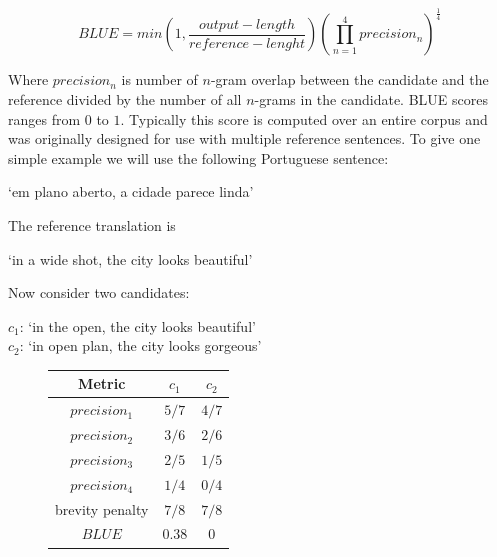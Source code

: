\begin{equation}
BLUE = min \left(1, \frac{output-length}{reference-lenght} \right) \left(\prod_{n=1}^{4} precision_{n} \right)^{\frac{1}{4}}
\end{equation}

Where $precision_{n}$ is number of $n$-gram overlap between the candidate and the reference divided by the number of all $n$-grams in the candidate. BLUE scores ranges from $0$ to $1$. Typically this score is computed over an entire corpus and was originally designed for use with multiple reference sentences. To give one simple example we will use the following Portuguese sentence:

\begin{center}
`em plano aberto, a cidade parece linda'
\end{center}

The reference translation is

\begin{center}
`in a wide shot, the city looks beautiful'
\end{center}

Now consider two candidates:

\begin{center}
$c_1$: `in the open, the city looks beautiful'\\
$c_2$: `in open plan, the city looks gorgeous'\\
\end{center}

\begin{figure}
\label{bluetable}
\begin{center}
\begin{tabular}{|c|c|c|}
\hline
\cellcolor{blue!10} Metric& \cellcolor{blue!10} $c_1$ & \cellcolor{blue!10} $c_2$ \\ \hline
\cellcolor{blue!10} $precision_1$& $5/7$ & $4/7$ \\ \hline
\cellcolor{blue!10} $precision_2$& $3/6$ & $2/6$  \\ \hline
\cellcolor{blue!10} $precision_3$& $2/5$ & $1/5$  \\ \hline
\cellcolor{blue!10} $precision_4$& $1/4$ & $0/4$  \\ \hline
\cellcolor{blue!10} brevity penalty& $7/8$ & $7/8$  \\ \hline
\cellcolor{blue!10} $BLUE$& $0.38$ & $0$ \\ \hline
\end{tabular}
\end{center}
\end{figure}


